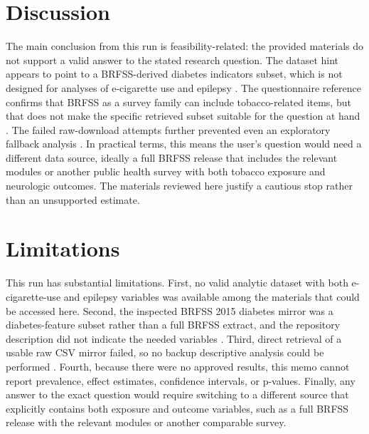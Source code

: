 \documentclass[11pt]{article}
\begin{document}
\section{Discussion}
The main conclusion from this run is feasibility-related: the provided materials do not support a valid answer to the stated research question. The dataset hint appears to point to a BRFSS-derived diabetes indicators subset, which is not designed for analyses of e-cigarette use and epilepsy \cite{ref1}. The questionnaire reference confirms that BRFSS as a survey family can include tobacco-related items, but that does not make the specific retrieved subset suitable for the question at hand \cite{ref2}. The failed raw-download attempts further prevented even an exploratory fallback analysis \cite{ref3}. In practical terms, this means the user’s question would need a different data source, ideally a full BRFSS release that includes the relevant modules or another public health survey with both tobacco exposure and neurologic outcomes. The materials reviewed here justify a cautious stop rather than an unsupported estimate.

\section{Limitations}
This run has substantial limitations. First, no valid analytic dataset with both e-cigarette-use and epilepsy variables was available among the materials that could be accessed here. Second, the inspected BRFSS 2015 diabetes mirror was a diabetes-feature subset rather than a full BRFSS extract, and the repository description did not indicate the needed variables \cite{ref1}. Third, direct retrieval of a usable raw CSV mirror failed, so no backup descriptive analysis could be performed \cite{ref3}. Fourth, because there were no approved results, this memo cannot report prevalence, effect estimates, confidence intervals, or p-values. Finally, any answer to the exact question would require switching to a different source that explicitly contains both exposure and outcome variables, such as a full BRFSS release with the relevant modules or another comparable survey.



\end{document}
